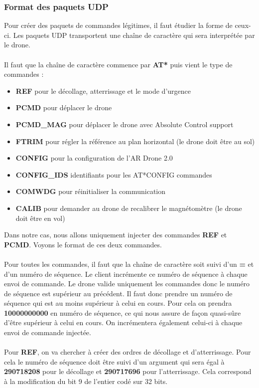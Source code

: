 \subsubsection{Format des paquets UDP}
Pour créer des paquets de commandes légitimes, il faut étudier la forme de ceux-ci. Les paquets UDP transportent une chaîne de caractère qui sera interprétée par le drone.\\\\
Il faut que la chaîne de caractère commence par \textbf{AT*} puis vient le type de commandes :
\medbreak
\begin{itemize}
\item \textbf{REF} pour le décollage, atterrissage et le mode d'urgence
\item \textbf{PCMD} pour déplacer le drone
\item \textbf{PCMD\_MAG} pour déplacer le drone avec Absolute Control support
\item \textbf{FTRIM} pour régler la référence au plan horizontal (le drone doit être au sol)
\item \textbf{CONFIG} pour la configuration de l'AR Drone 2.0
\item \textbf{CONFIG\_IDS} identifiants pour les AT*CONFIG commandes
\item \textbf{COMWDG} pour réinitialiser la communication
\item \textbf{CALIB} pour demander au drone de recalibrer le magnétomètre (le drone doit être en vol)
\end{itemize}
\medbreak
Dans notre cas, nous allons uniquement injecter des commandes \textbf{REF} et \textbf{PCMD}. Voyons le format de ces deux commandes.\\\\
Pour toutes les commandes, il faut que la chaîne de caractère soit suivi d'un \textbf{=} et d'un numéro de séquence. Le client incrémente ce numéro de séquence à chaque envoi de commande. Le drone valide uniquement les commandes donc le numéro de séquence est supérieur au précédent. Il faut donc prendre un numéro de séquence qui est au moins supérieur à celui en cours. Pour cela on prendra \textbf{10000000000} en numéro de séquence, ce qui nous assure de façon quasi-sûre d'être supérieur à celui en cours. On incrémentera également celui-ci à chaque envoi de commande injectée.\\\\
Pour \textbf{REF}, on va chercher à créer des ordres de décollage et d’atterrissage. Pour cela le numéro de séquence doit être suivi d'un argument qui sera égal à \textbf{290718208} pour le décollage et \textbf{290717696} pour l'atterrissage. Cela correspond à la modification du bit 9 de l'entier codé sur 32 bits.\\\\
